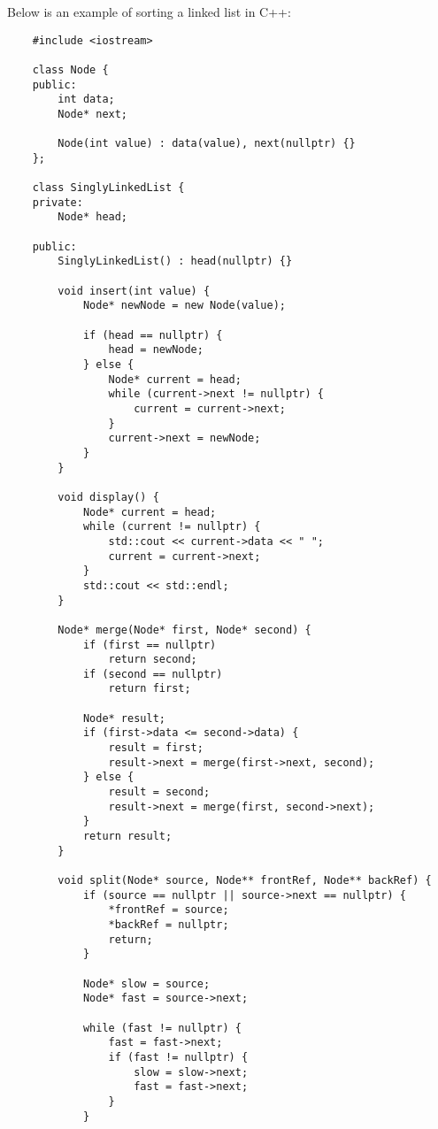 \begin{solution}
    Below is an example of sorting a linked list in C++:

    \horizontalline

    \begin{verbatim}
    #include <iostream>

    class Node {
    public:
        int data;
        Node* next;
    
        Node(int value) : data(value), next(nullptr) {}
    };
    
    class SinglyLinkedList {
    private:
        Node* head;
    
    public:
        SinglyLinkedList() : head(nullptr) {}
    
        void insert(int value) {
            Node* newNode = new Node(value);
    
            if (head == nullptr) {
                head = newNode;
            } else {
                Node* current = head;
                while (current->next != nullptr) {
                    current = current->next;
                }
                current->next = newNode;
            }
        }
    
        void display() {
            Node* current = head;
            while (current != nullptr) {
                std::cout << current->data << " ";
                current = current->next;
            }
            std::cout << std::endl;
        }
    
        Node* merge(Node* first, Node* second) {
            if (first == nullptr)
                return second;
            if (second == nullptr)
                return first;
    
            Node* result;
            if (first->data <= second->data) {
                result = first;
                result->next = merge(first->next, second);
            } else {
                result = second;
                result->next = merge(first, second->next);
            }
            return result;
        }
    
        void split(Node* source, Node** frontRef, Node** backRef) {
            if (source == nullptr || source->next == nullptr) {
                *frontRef = source;
                *backRef = nullptr;
                return;
            }
    
            Node* slow = source;
            Node* fast = source->next;
    
            while (fast != nullptr) {
                fast = fast->next;
                if (fast != nullptr) {
                    slow = slow->next;
                    fast = fast->next;
                }
            }
    

\end{verbatim}
\end{solution}

